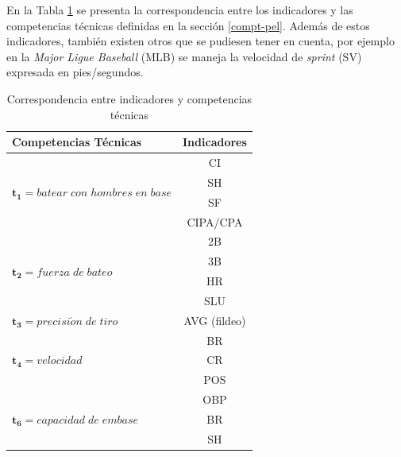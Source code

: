 \newpage
{}
\recalctypearea

En la Tabla \ref{correspondencia-pel} se presenta la correspondencia entre los indicadores y las competencias técnicas definidas en la sección \ref{compt-pel}. Además de estos indicadores, también existen otros que se pudiesen tener en cuenta, por ejemplo en la \textit{Major Ligue Baseball} (MLB) se maneja la velocidad de \textit{sprint} (SV) expresada en pies/segundos.

\begin{table} [H]
	\centering
	\caption{Correspondencia entre indicadores y competencias técnicas} \label{correspondencia-pel}
	\begin{tabular}{|l|c|}
		\hline
		\textbf{Competencias Técnicas}                                          & \textbf{Indicadores} \\ \hline
		\multirow{4}{5.4cm}{$\boldsymbol{t_1}=batear\;con\;hombres\;en\;base $} &          CI          \\
		                                                                        &          SH          \\
		                                                                        &          SF          \\
		                                                                        &         CIPA/CPA        \\ \hline
		\multirow{4}{5.4cm}{$\boldsymbol{t_2}=fuerza\;de\;bateo $}              &          2B          \\
		                                                                        &          3B          \\
		                                                                        &          HR          \\
		                                                                        &         SLU          \\ \hline
		$\boldsymbol{t_3}= precisi\acute{o}n\;de\;tiro $                        &     AVG (fildeo)     \\ \hline
		\multirow{3}{5.4cm}{$\boldsymbol{t_4}= velocidad $}                     &          BR          \\
		                                                                        &          CR          \\\hline
		$\boldsymbol{t_5}= versatilidad $                                       &         POS          \\ \hline
		\multirow{3}{5.4cm}{$\boldsymbol{t_6}=capacidad\;de\;embase$}           &         OBP          \\
		                                                                        &          BR          \\
		                                                                        &          SH          \\ \hline
	\end{tabular}
\end{table}

